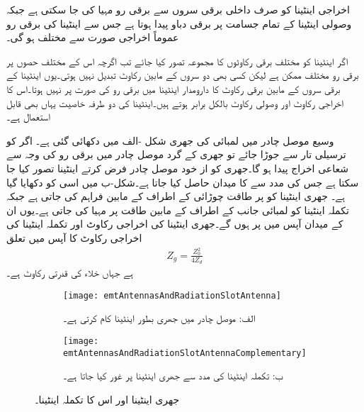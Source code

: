 اخراجی اینٹینا کو صرف داخلی برقی سروں سے برقی رو مہیا کی جا سکتی ہے جبکہ وصولی اینٹینا کے تمام جسامت پر برقی دباو پیدا ہوتا ہے جس سے اینٹینا کی برقی رو عموماً اخراجی صورت سے مختلف ہو گی۔

اگر اینٹینا کو مختلف برقی رکاوٹوں کا مجموعہ تصور کیا جائے تب اگرچہ اس کے مختلف حصوں پر برقی رو مختلف ممکن ہے لیکن کسی بھی دو سروں کے مابین رکاوٹ تبدیل نہیں ہوتی۔یوں اینٹینا کے برقی سروں کے مابین برقی رکاوٹ کا دارومدار اینٹینا میں برقی رو کی صورت پر نہیں ہوتا۔اس کا اخراجی رکاوٹ اور وصولی رکاوٹ بالکل برابر ہوتے ہیں۔اینٹینا کی دو طرفہ خاصیت یہاں بھی قابل استعمال ہے۔

وسیع موصل چادر میں  لمبائی کی جھری شکل -الف میں دکھائی گئی ہے۔ اگر  کو ترسیلی تار سے جوڑا جائے تو جھری کے گرد موصل چادر میں برقی رو کی وجہ سے شعاعی اخراج پیدا ہو گا۔جھری کو از خود موصل چادر فرض کرتے  اینٹینا تصور کیا جا سکتا ہے جس کی مدد سے   کا میدان حاصل کیا جاتا ہے۔شکل-ب میں اسی  کو دکھایا گیا ہے۔ جھری اینٹینا کو  پر طاقت چوڑائی کے اطراف کے مابین فراہم کی جاتی ہے جبکہ تکملہ اینٹینا کو لمبائی جانب کے اطراف کے مابین طاقت  پر مہیا کی جاتی ہے۔یوں ان کے میدان آپس میں  پر ہوں گے۔جھری اینٹینا کی اخراجی رکاوٹ  اور تکملہ اینٹینا کی اخراجی رکاوٹ  کا آپس میں تعلق
\begin{align}
Z_g = \frac{Z_0^2}{4 Z_{d}}
\end{align}
ہے جہاں  خلاء کی قدرتی رکاوٹ ہے۔

\begin{figure}
\centering
\begin{subfigure}{0.5\textwidth}
\centering
\texttt{[image: emtAntennasAndRadiationSlotAntenna]}
\caption*{الف: موصل چادر میں جھری بطور اینٹینا کام کرتی ہے۔}
\end{subfigure}%
%
\begin{subfigure}{0.5\textwidth}
\centering
\texttt{[image: emtAntennasAndRadiationSlotAntennaComplementary]}
\caption*{ب: تکملہ اینٹینا کی مدد سے جھری اینٹینا پر غور کیا جاتا ہے۔}
\end{subfigure}%
\caption{جھری اینٹینا اور اس کا تکملہ اینٹینا۔}
\label{شکل_اینٹینا_جھری_اینٹینا}
\end{figure}

